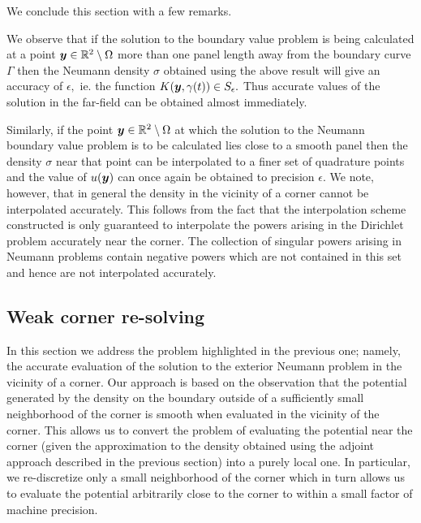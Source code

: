 We conclude this section with a few remarks. 

\begin{remark1}
We observe that if the solution to the boundary value problem is being calculated at a point $\boldsymbol{y} \in \mathbb{R}^2\setminus \Omega$ more than one panel length away from the boundary curve $\Gamma$ then the Neumann density $\sigma$ obtained using the above result will give an accuracy of $\epsilon,$ ie. the function $K(\boldsymbol{y},\gamma(t)) \in S_\epsilon.$ Thus accurate values of the solution in the far-field can be obtained almost immediately.
\end{remark1}
\begin{remark1}
Similarly, if the point $\boldsymbol{y} \in \mathbb{R}^2 \setminus \Omega$ at which the solution to the Neumann boundary value problem is to be calculated lies close to a smooth panel then the density $\sigma$ near that point can be interpolated to a finer set of quadrature points and the value of $u(\boldsymbol{y})$ can once again be obtained to precision $\epsilon.$ We note, however, that in general the density in the vicinity of a corner cannot be interpolated accurately. This follows from the fact that the interpolation scheme constructed is only guaranteed to interpolate the powers arising in the Dirichlet problem accurately near the corner. The collection of singular powers arising in Neumann problems contain negative powers which are not contained in this set and hence are not interpolated accurately.
\end{remark1}

\subsection{Weak corner re-solving \label{sec:resolve}}
In this section we address the problem highlighted in the previous one; namely, the accurate evaluation of the solution to the exterior Neumann problem in the vicinity of a corner. Our approach is based on the observation that the potential generated by the density on the boundary outside of a sufficiently small neighborhood of the corner is smooth when evaluated in the vicinity of the corner. This allows us to convert the problem of evaluating the potential near the corner (given the approximation to the density obtained using the adjoint approach described in the previous section) into a purely local one. In particular, we re-discretize only a small neighborhood of the corner which in turn allows us to evaluate the potential arbitrarily close to the corner to within a small factor of machine precision. 

